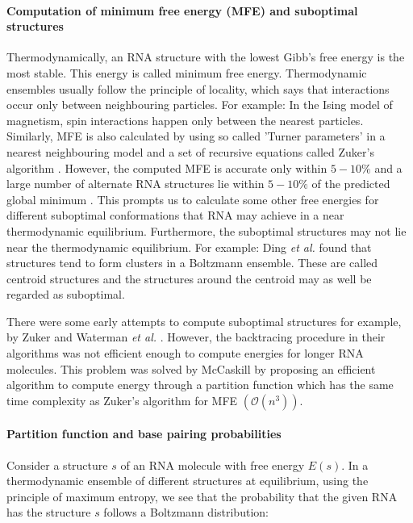 \paragraph{Computation of minimum free energy (MFE) and suboptimal structures}
Thermodynamically, an RNA structure with the lowest Gibb's free energy is the most stable. This energy is called minimum free energy. Thermodynamic ensembles usually follow the principle of locality, which says that interactions occur only between neighbouring particles. For example: In the Ising model of magnetism, spin interactions happen only between the nearest particles. Similarly, MFE is also calculated by using so called 'Turner parameters' \cite{turner2009nndb} in a nearest neighbouring model and a set of recursive equations called Zuker's algorithm \cite{zuker1981optimal}. However, the computed MFE is accurate only within $5-10\%$ and a large number of alternate RNA structures lie within $5-10\%$ of the predicted global minimum \cite{eddy2004rna}. This prompts us to calculate some other free energies for different suboptimal conformations that RNA may achieve in a near thermodynamic equilibrium. Furthermore, the suboptimal structures may not lie near the thermodynamic equilibrium. For example: Ding \textit{et al.} \cite{ding2005rna}  found that structures tend to form clusters in a Boltzmann ensemble. These are called centroid structures and the structures around the centroid may as well be regarded as suboptimal. 

There were some early attempts to compute suboptimal structures for example, by Zuker \cite{zuker1989finding} and Waterman \textit{et al.} \cite{waterman1985dynamic}. However, the backtracing procedure in their algorithms was not efficient enough to compute energies for longer RNA molecules. This problem was solved by McCaskill \cite{mccaskill1990equilibrium} by proposing an efficient algorithm to compute energy through a partition function which has the same time complexity as Zuker's algorithm for MFE $(\mathcal{O}(n^{3}))$.

\paragraph{Partition function and base pairing probabilities}
Consider a structure $s$ of an RNA molecule with free energy $E(s)$. In a thermodynamic ensemble of different structures at equilibrium, using the principle of maximum entropy, we see that the probability that the given RNA has the structure $s$ follows a Boltzmann distribution:

